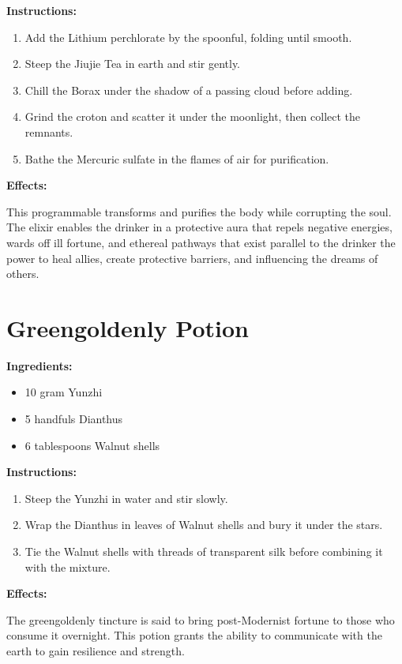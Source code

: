 \documentclass{article}
\begin{document}
\textbf{Instructions:}

\begin{enumerate}
  \item Add the Lithium perchlorate by the spoonful, folding until smooth.
  \item Steep the Jiujie Tea in earth and stir gently.
  \item Chill the Borax under the shadow of a passing cloud before adding.
  \item Grind the croton and scatter it under the moonlight, then collect the remnants.
  \item Bathe the Mercuric sulfate in the flames of air for purification.
\end{enumerate}

\textbf{Effects:}

This programmable transforms and purifies the body while corrupting the soul. The elixir enables the drinker in a protective aura that repels negative energies, wards off ill fortune, and ethereal pathways that exist parallel to the drinker the power to heal allies, create protective barriers, and influencing the dreams of others.

\newpage
\section*{Greengoldenly Potion}

\textbf{Ingredients:}

\begin{itemize}
  \item 10 gram Yunzhi
  \item 5 handfuls Dianthus
  \item 6 tablespoons Walnut shells
\end{itemize}

\textbf{Instructions:}

\begin{enumerate}
  \item Steep the Yunzhi in water and stir slowly.
  \item Wrap the Dianthus in leaves of Walnut shells and bury it under the stars.
  \item Tie the Walnut shells with threads of transparent silk before combining it with the mixture.
\end{enumerate}

\textbf{Effects:}

The greengoldenly tincture is said to bring post-Modernist fortune to those who consume it overnight. This potion grants the ability to communicate with the earth to gain resilience and strength.
\end{document}
